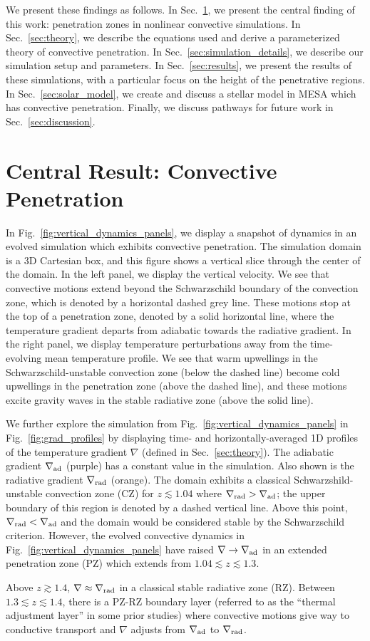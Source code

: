 \documentclass[twocolumn, linenumbers]{aastex631}
\newcommand{\gradrad}{\ensuremath{\nabla_{\rm{rad}}}}
\newcommand{\gradad}{\ensuremath{\nabla_{\rm{ad}}}}
\newcommand{\justgrad}{\ensuremath{\nabla}}
\newcommand{\editone}[1]{#1}
\begin{document}
We present these findings as follows.
In Sec.~\ref{sec:central_results}, we present the central finding of this work: penetration zones in nonlinear convective simulations.
In Sec.~\ref{sec:theory}, we describe the equations used and derive a parameterized theory of convective penetration.
In Sec.~\ref{sec:simulation_details}, we describe our simulation setup and parameters.
In Sec.~\ref{sec:results}, we present the results of these simulations, with a particular focus on the height of the penetrative regions.
In Sec.~\ref{sec:solar_model}, we create and discuss a stellar model in MESA which has convective penetration.
Finally, we discuss pathways for future work in Sec.~\ref{sec:discussion}.

\section{Central Result: Convective Penetration}
\label{sec:central_results}

In Fig.~\ref{fig:vertical_dynamics_panels}, we display a snapshot of dynamics in an evolved simulation which exhibits convective penetration.
The simulation domain is a 3D Cartesian box, and this figure shows a vertical slice through the center of the domain.
In the left panel, we display the vertical velocity.
We see that convective motions extend beyond the Schwarzschild boundary of the convection zone, which is denoted by a horizontal dashed grey line.
These motions stop at the top of a penetration zone, denoted by a solid horizontal line, where the temperature gradient departs from adiabatic towards the radiative gradient.
In the right panel, we display temperature perturbations away from the time-evolving mean temperature profile.
We see that warm upwellings in the Schwarzschild-unstable convection zone (below the dashed line) become cold upwellings in the penetration zone (above the dashed line), and these motions excite gravity waves in the stable radiative zone (above the solid line).

We further explore the simulation from Fig.~\ref{fig:vertical_dynamics_panels} in Fig.~\ref{fig:grad_profiles} by displaying time- and horizontally-averaged 1D profiles of the temperature gradient $\justgrad$ (defined in Sec.~\ref{sec:theory}).
The adiabatic gradient $\gradad$ (purple) has a constant value in the simulation.
Also shown is the radiative gradient $\gradrad$ (orange).
The domain exhibits a classical Schwarzshild-unstable convection zone (CZ) for $z \lesssim 1.04$ where $\gradrad > \gradad$; the upper boundary of this region is denoted by a dashed vertical line.
Above this point, $\gradrad < \gradad$ and the domain would be considered stable by the Schwarzschild criterion.
However, the evolved convective dynamics in Fig.~\ref{fig:vertical_dynamics_panels} have raised $\justgrad \rightarrow \gradad$ in an extended penetration zone (PZ) which extends from $1.04 \lesssim z \lesssim 1.3$.
\editone{
    Above $z \gtrsim 1.4$, $\justgrad \approx \gradrad$ in a classical stable radiative zone (RZ).
    Between $1.3 \lesssim z \lesssim 1.4$, there is a PZ-RZ boundary layer (referred to as the ``thermal adjustment layer'' in some prior studies) where convective motions give way to conductive transport and $\justgrad$ adjusts from $\gradad$ to $\gradrad$.
}
\end{document}
